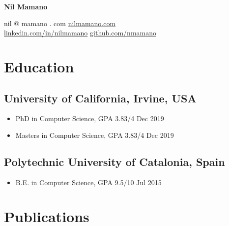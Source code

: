 \documentclass[letterpaper,10pt,oneside]{article}
\begin{document}
\begin{center}
\LARGE{\textbf{Nil Mamano}}\\
\end{center}
\vspace{-2ex}
\hrulefill
\normalsize
\vspace{1em}


\noindent nil @ mamano . com \hfill \href{http://www.nilmamano.com}{nilmamano.com} \\
\noindent\href{https://www.linkedin.com/in/nilmamano/}{linkedin.com/in/nilmamano} \hfill \href{https://github.com/nmamano}{github.com/nmamano}  \\ 


\section*{Education}
\subsection*{University of California, Irvine, USA}
\begin{itemize}
    \item PhD in Computer Science, GPA 3.83/4 \hfill Dec 2019
    \item Masters in Computer Science, GPA 3.83/4 \hfill Dec 2019
\end{itemize}
\subsection*{Polytechnic University of Catalonia, Spain}
\begin{itemize}
    \item B.E. in Computer Science, GPA 9.5/10 \hfill Jul 2015
\end{itemize}

\section*{Publications}
\end{document}
